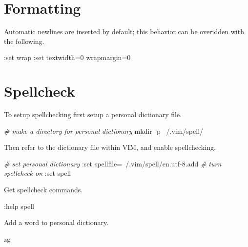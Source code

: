\documentclass[]{book}
\newenvironment{Shaded}{\begin{snugshade}}{\end{snugshade}}
\newcommand{\CommentTok}[1]{\textcolor[rgb]{0.56,0.35,0.01}{\textit{#1}}}
\newcommand{\ExtensionTok}[1]{#1}
\newcommand{\FunctionTok}[1]{\textcolor[rgb]{0.00,0.00,0.00}{#1}}
\newcommand{\NormalTok}[1]{#1}
\begin{document}
\hypertarget{formatting}{%
\section{Formatting}\label{formatting}}

Automatic newlines are inserted by default; this behavior can be overidden with the following.

\begin{Shaded}
\begin{Highlighting}[]
\NormalTok{:}\ExtensionTok{set}\NormalTok{ wrap}
\NormalTok{:}\ExtensionTok{set}\NormalTok{ textwidth=0 wrapmargin=0}
\end{Highlighting}
\end{Shaded}

\hypertarget{spellcheck}{%
\section{Spellcheck}\label{spellcheck}}

To setup spellchecking first setup a personal dictionary file.

\begin{Shaded}
\begin{Highlighting}[]
\CommentTok{# make a directory for personal dictionary}
\FunctionTok{mkdir}\NormalTok{ -p ~/.vim/spell/}
\end{Highlighting}
\end{Shaded}

Then refer to the dictionary file within VIM, and enable spellchecking.

\begin{Shaded}
\begin{Highlighting}[]
\CommentTok{# set personal dictionary}
\NormalTok{:}\ExtensionTok{set}\NormalTok{ spellfile=~/.vim/spell/en.utf-8.add}
\CommentTok{# turn spellcheck on}
\NormalTok{:}\ExtensionTok{set}\NormalTok{ spell}
\end{Highlighting}
\end{Shaded}

Get spellcheck commands.

\begin{Shaded}
\begin{Highlighting}[]
\NormalTok{:}\ExtensionTok{help}\NormalTok{ spell}
\end{Highlighting}
\end{Shaded}

Add a word to personal dictionary.

\begin{Shaded}
\begin{Highlighting}[]
\ExtensionTok{zg}
\end{Highlighting}
\end{Shaded}
\end{document}

